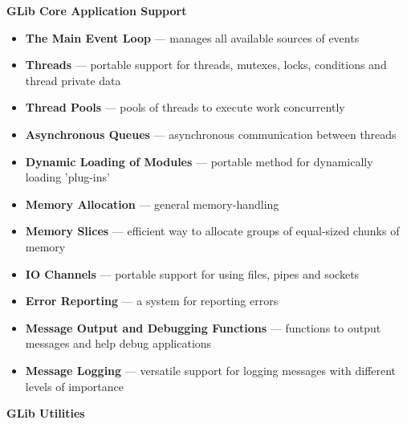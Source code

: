 \documentclass[12pt]{article}
\begin{document}
\begin{itemize}
\textbf{GLib Core Application Support}
\begin{itemize}


\item \textbf{The Main Event Loop} — manages all available sources of events
\item \textbf{Threads} — portable support for threads, mutexes, locks, conditions and thread private data
\item \textbf{Thread Pools} — pools of threads to execute work concurrently
\item \textbf{Asynchronous Queues} — asynchronous communication between threads
\item \textbf{Dynamic Loading of Modules} — portable method for dynamically loading 'plug-ins'
\item \textbf{Memory Allocation} — general memory-handling
\item \textbf{Memory Slices} — efficient way to allocate groups of equal-sized chunks of memory
\item \textbf{IO Channels} — portable support for using files, pipes and sockets
\item \textbf{Error Reporting} — a system for reporting errors
\item \textbf{Message Output and Debugging Functions} — functions to output messages and help debug applications
\item \textbf{Message Logging} — versatile support for logging messages with different levels of importance




\end{itemize}

\clearpage

\textbf{GLib Utilities}
\begin{itemize}



\end{itemize}
\end{itemize}
\end{document}
